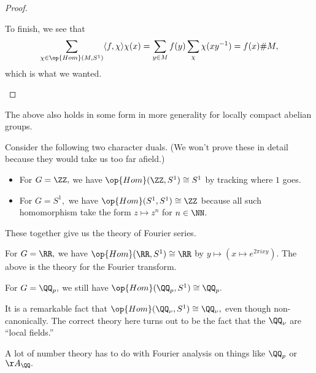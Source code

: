 \documentclass[../notes.tex]{subfiles}
\begin{document}
\begin{proof}
\begin{itemize}
		To finish, we see that
		\[\sum_{\chi\in\op{Hom}(M,S^1)}\langle f,\chi\rangle\chi(x)=\sum_{y\in M}f(y)\sum_\chi\chi(xy^{-1})=f(x)\#M,\]
		which is what we wanted.
		\qedhere
	\end{itemize}
\end{proof}
The above also holds in some form in more generality for locally compact abelian groups.
\begin{example}
	Consider the following two character duals. (We won't prove these in detail because they would take us too far afield.)
	\begin{itemize}
		\item For $G=\ZZ,$ we have $\op{Hom}(\ZZ,S^1)\cong S^1$ by tracking where $1$ goes.
		\item For $G=S^1,$ we have $\op{Hom}(S^1,S^1)\cong\ZZ$ because all such homomorphism take the form $z\mapsto z^n$ for $n\in\NN.$
	\end{itemize}
	These together give us the theory of Fourier series.
\end{example}
\begin{example}
	For $G=\RR,$ we have $\op{Hom}(\RR,S^1)\cong\RR$ by $y\mapsto(x\mapsto e^{2\pi ixy}).$ The above is the theory for the Fourier transform.
\end{example}
\begin{example}
	For $G=\QQ_p,$ we still have $\op{Hom}(\QQ_p,S^1)\cong\QQ_p.$
\end{example}
\begin{remark}[Nir]
	It is a remarkable fact that $\op{Hom}(\QQ_\nu,S^1)\cong\QQ_\nu,$ even though non-canonically. The correct theory here turns out to be the fact that the $\QQ_\nu$ are ``local fields.''
\end{remark}
\begin{remark}
	A lot of number theory has to do with Fourier analysis on things like $\QQ_p$ or $\AA_\QQ.$
\end{remark}
\end{document}
